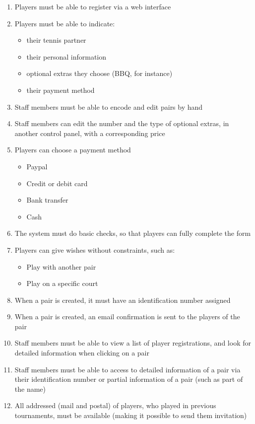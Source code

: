 \begin{enumerate}
	 \item Players must be able to register via a web interface
	 \item Players must be able to indicate:
		 \begin{itemize}
		 	\item their tennis partner
		 	\item their personal information
		 	\item optional extras they choose (BBQ, for instance)
		 	\item their payment method
		\end{itemize}
	\item Staff members must be able to encode and edit pairs by hand
    \item Staff members can edit the number and the type of optional extras, in another control panel, with a corresponding price
    \item Players can choose a payment method
   		 \begin{itemize}
    			\item Paypal
    			\item Credit or debit card
    			\item Bank transfer
    			\item Cash
    		\end{itemize}
     \item The system must do basic checks, so that players can fully complete the form
   	 \item Players can give wishes without constraints, such as:
    		\begin{itemize}
    			\item Play with another pair
    			\item Play on a specific court
    		\end{itemize}
    	\item When a pair is created, it must have an identification number assigned
    	\item When a pair is created, an email confirmation is sent to the players of the pair
    	\item Staff members must be able to view a list of player registrations, and look for detailed information when clicking on a pair
   	 \item Staff members must be able to access to detailed information of a pair via their identification number or partial information of a pair (such as part of the name)
   	 \item All addressed (mail and postal) of players, who played in previous tournaments, must be available (making it possible to send them invitation)

\end{enumerate}
